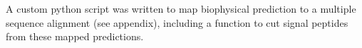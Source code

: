 A custom python script was written to map biophysical prediction to a multiple sequence alignment (see appendix),
including a function to cut signal peptides from these mapped predictions.
